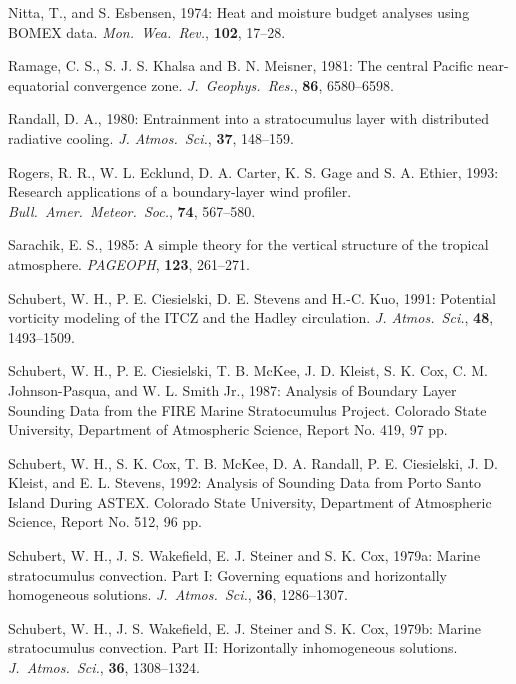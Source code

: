 
Nitta, T., and S. Esbensen, 1974: Heat and moisture budget analyses using
BOMEX data.  {\sl Mon.\ Wea.\ Rev.}, {\bf 102}, 17--28.

Ramage, C. S., S. J. S. Khalsa and B. N. Meisner, 1981:  The central Pacific
near-equatorial convergence zone. {\sl J.\ Geophys.\ Res.}, {\bf 86},
6580--6598.

Randall, D. A., 1980: Entrainment into a stratocumulus layer with distributed
radiative cooling. {\sl J. Atmos.\ Sci.}, {\bf 37}, 148--159.

Rogers, R. R., W. L. Ecklund, D. A. Carter, K. S. Gage and S. A. Ethier, 1993:
 Research applications of a boundary-layer wind profiler. {\sl Bull.\ Amer.\ 
Meteor.\ Soc.}, {\bf 74}, 567--580.

Sarachik, E. S., 1985: A simple theory for the vertical structure of the
tropical atmosphere. {\sl PAGEOPH}, {\bf 123}, 261--271.

Schubert, W. H., P. E. Ciesielski, D. E. Stevens and H.-C. Kuo, 1991:
Potential vorticity modeling of the ITCZ and the Hadley circulation.
{\sl J. Atmos.\ Sci.}, {\bf 48}, 1493--1509.

Schubert, W. H., P. E. Ciesielski, T. B. McKee, J. D. Kleist, S. K. Cox, C. M.
Johnson-Pasqua, and W. L. Smith Jr., 1987:  Analysis of Boundary Layer
Sounding Data from the FIRE Marine Stratocumulus Project. Colorado State
University, Department of Atmospheric Science, Report No. 419, 97 pp.

Schubert, W. H., S. K. Cox, T. B. McKee, D. A. Randall, P. E. Ciesielski, J.
D. Kleist, and E. L. Stevens, 1992:  Analysis of Sounding Data from Porto
Santo Island During ASTEX. Colorado State University, Department of
Atmospheric Science, Report No. 512, 96 pp.

Schubert, W. H., J. S. Wakefield, E. J. Steiner and S. K. Cox, 1979a: Marine
stratocumulus convection. Part I: Governing equations and horizontally
homogeneous solutions. {\sl J.\ Atmos.\ Sci.}, {\bf 36}, 1286--1307.

Schubert, W. H., J. S. Wakefield, E. J. Steiner and S. K. Cox, 1979b: Marine
stratocumulus convection. Part II:  Horizontally inhomogeneous solutions.
{\sl J.\ Atmos.\ Sci.}, {\bf 36}, 1308--1324.


